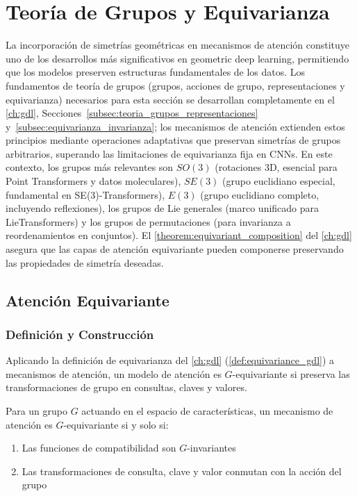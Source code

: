 \section{Teoría de Grupos y Equivarianza}

La incorporación de simetrías geométricas en mecanismos de atención constituye uno de los desarrollos más significativos en geometric deep learning, permitiendo que los modelos preserven estructuras fundamentales de los datos. Los fundamentos de teoría de grupos (grupos, acciones de grupo, representaciones y equivarianza) necesarios para esta sección se desarrollan completamente en el \autoref{ch:gdl}, Secciones~\ref{subsec:teoria_grupos_representaciones} y~\ref{subsec:equivarianza_invarianza}; los mecanismos de atención extienden estos principios mediante operaciones adaptativas que preservan simetrías de grupos arbitrarios, superando las limitaciones de equivarianza fija en \glspl{CNN}. En este contexto, los grupos más relevantes son $SO(3)$ (rotaciones 3D, esencial para Point \glspl{Transformer} y datos moleculares), $SE(3)$ (grupo euclidiano especial, fundamental en SE(3)-\glspl{Transformer}), $E(3)$ (grupo euclidiano completo, incluyendo reflexiones), los grupos de Lie generales (marco unificado para Lie\glspl{Transformer}) y los grupos de permutaciones (para invarianza a reordenamientos en conjuntos). El \autoref{theorem:equivariant_composition} del \autoref{ch:gdl} asegura que las capas de atención equivariante pueden componerse preservando las propiedades de simetría deseadas.

\subsection{Atención Equivariante}\label{subsec:equivariant_attention}\label{sec:equivariant_attention}

\subsubsection{Definición y Construcción}

Aplicando la definición de equivarianza del \autoref{ch:gdl} (\autoref{def:equivariance_gdl}) a mecanismos de atención, un modelo de atención es $G$-equivariante si preserva las transformaciones de grupo en consultas, claves y valores.

\begin{theorem}
    Para un grupo $G$ actuando en el espacio de características, un mecanismo de atención es $G$-equivariante si y solo si:
    \begin{enumerate}
        \item Las funciones de compatibilidad son $G$-invariantes
        \item Las transformaciones de consulta, clave y valor conmutan con la acción del grupo
    \end{enumerate}
\end{theorem}

